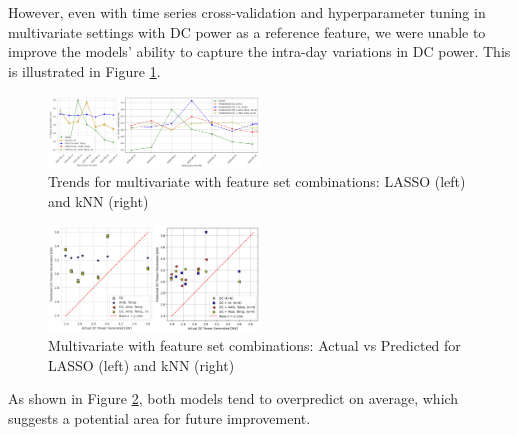 However, even with time series cross-validation and hyperparameter tuning in multivariate settings with DC power as a reference feature, we were unable to improve the models' ability to capture the intra-day variations in DC power. This is illustrated in Figure \ref{fig:hourDCF}.

\begin{figure}[h]
    \centering
    \includegraphics[width=0.5\textwidth]{Figures/hourDCF.png}
    \caption{Trends for multivariate with feature set combinations: LASSO (left) and kNN (right)}
    \label{fig:hourDCF}
\end{figure}

\begin{figure}[h]
    \centering
    \includegraphics[width=0.5\textwidth]{Figures/multi_pred_vs_actual.jpg}
    \caption{Multivariate with feature set combinations: Actual vs Predicted for LASSO (left) and kNN (right)}
    \label{fig:multi-pred-actual}
\end{figure}

As shown in Figure \ref{fig:multi-pred-actual}, both models tend to overpredict on average, which suggests a potential area for future improvement.

